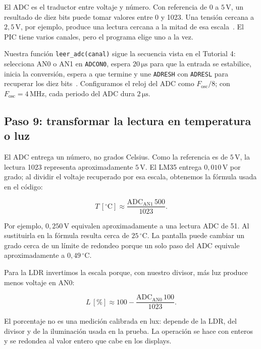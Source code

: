 \documentclass[11pt,a4paper]{article}
\begin{document}
El ADC es el traductor entre voltaje y número. Con referencia de \(0\) a \(5\,\mathrm V\), un resultado de diez bits puede tomar valores entre 0 y 1023. Una tensión cercana a \(2{,}5\,\mathrm V\), por ejemplo, produce una lectura cercana a la mitad de esa escala~\cite{claseanalog}. El PIC tiene varios canales, pero el programa elige uno a la vez.

Nuestra función \texttt{leer\_adc(canal)} sigue la secuencia vista en el Tutorial 4: selecciona AN0 o AN1 en \texttt{ADCON0}, espera \(20\,\mathrm{\mu s}\) para que la entrada se estabilice, inicia la conversión, espera a que termine y une \texttt{ADRESH} con \texttt{ADRESL} para recuperar los diez bits~\cite{claseanalog}. Configuramos el reloj del ADC como \(F_{\mathrm{osc}}/8\); con \(F_{\mathrm{osc}}=4\,\mathrm{MHz}\), cada periodo del ADC dura \(2\,\mathrm{\mu s}\).

\subsection{Paso 9: transformar la lectura en temperatura o luz}

El ADC entrega un número, no grados Celsius. Como la referencia es de \(5\,\mathrm V\), la lectura 1023 representa aproximadamente \(5\,\mathrm V\). El LM35 entrega \(0{,}010\,\mathrm V\) por grado; al dividir el voltaje recuperado por esa escala, obtenemos la fórmula usada en el código:

\begin{equation}
  T\,[{}^\circ\mathrm C] \approx \frac{\mathrm{ADC}_{\mathrm{AN1}}\,500}{1023}.
\end{equation}

Por ejemplo, \(0{,}250\,\mathrm V\) equivalen aproximadamente a una lectura ADC de 51. Al sustituirla en la fórmula resulta cerca de \(25\,{}^\circ\mathrm C\). La pantalla puede cambiar un grado cerca de un límite de redondeo porque un solo paso del ADC equivale aproximadamente a \(0{,}49\,{}^\circ\mathrm C\).

Para la LDR invertimos la escala porque, con nuestro divisor, más luz produce menos voltaje en AN0:

\begin{equation}
  L\,[\%] \approx 100 - \frac{\mathrm{ADC}_{\mathrm{AN0}}\,100}{1023}.
\end{equation}

El porcentaje no es una medición calibrada en lux: depende de la LDR, del divisor y de la iluminación usada en la prueba. La operación se hace con enteros y se redondea al valor entero que cabe en los displays.
\end{document}
